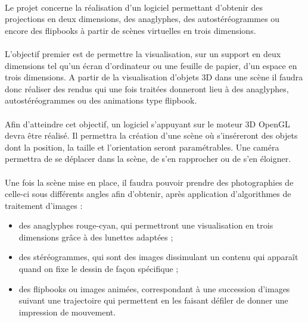 	\paragraph{}
	Le projet concerne la réalisation d’un logiciel permettant d’obtenir des projections en deux dimensions, des anaglyphes, des autostéréogrammes ou encore des flipbooks à partir de scènes virtuelles en trois dimensions. 

\paragraph{}
	L’objectif premier est de permettre la visualisation, sur un support en deux dimensions tel qu’un écran d’ordinateur ou une feuille de papier, d’un espace en trois dimensions. A partir de la visualisation d’objets 3D dans une scène il faudra donc réaliser des rendus qui une fois traitées donneront lieu à des anaglyphes, autostéréogrammes ou des animations type flipbook.
	
\paragraph{}
	Afin d’atteindre cet objectif, un logiciel s’appuyant sur le moteur 3D OpenGL devra être réalisé. Il permettra la création d’une scène où s’inséreront des objets dont la position, la taille et l’orientation seront paramétrables. Une caméra permettra de se déplacer dans la scène, de s’en rapprocher ou de s’en éloigner.

\paragraph{}
	Une fois la scène mise en place, il faudra pouvoir prendre des photographies de celle-ci sous différents angles afin d’obtenir, après application d’algorithmes de traitement d’images :

\begin{itemize}
	\item
		des anaglyphes rouge-cyan, qui permettront une visualisation en trois dimensions grâce à des lunettes adaptées ;
	\item
		des stéréogrammes, qui sont des images dissimulant un contenu qui apparaît quand on fixe le dessin de façon spécifique ;
	\item
		des flipbooks ou images animées, correspondant à une succession d’images suivant une trajectoire qui permettent en les faisant défiler de donner une impression de mouvement.
\end{itemize}
